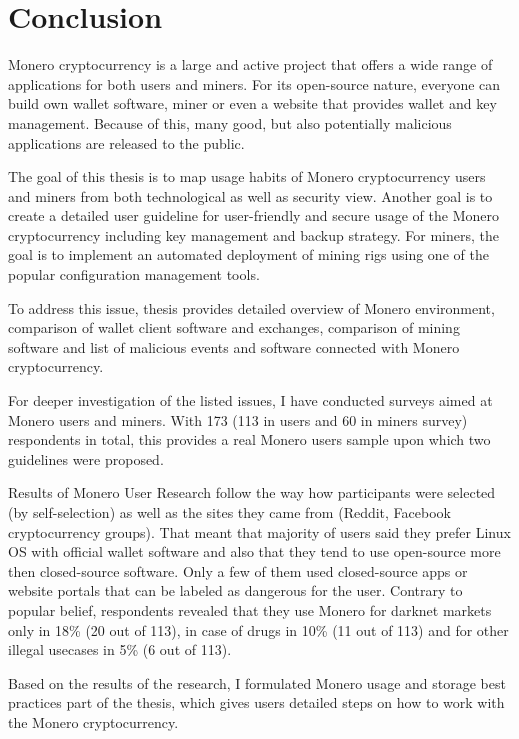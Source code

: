 \documentclass[
  printed, %
  table,   %
  lof,     %
  lot,     %
           oneside, color
]{fithesis3}
\begin{document}
\chapter{Conclusion}
Monero cryptocurrency is a large and active project that offers a wide range of applications for both users and miners. For its open-source nature, everyone can build own wallet software, miner or even a website that provides wallet and key management. Because of this, many good, but also potentially malicious applications are released to the public. 

The goal of this thesis is to map usage habits of Monero cryptocurrency users and miners from both technological as well as security view. Another goal is to create a detailed user guideline for user-friendly and secure usage of the Monero cryptocurrency including key management and backup strategy. For miners, the goal is to implement an automated deployment of mining rigs using one of the popular configuration management tools.

To address this issue, thesis provides detailed overview of Monero environment, comparison of wallet client software and exchanges, comparison of mining software and list of malicious events and software connected with Monero cryptocurrency.

For deeper investigation of the listed issues, I have conducted surveys aimed at Monero users and miners. With 173 (113 in users and 60 in miners survey) respondents in total, this provides a real Monero users sample upon which two guidelines were proposed. %

Results of Monero User Research follow the way how participants were selected (by self-selection) as well as the sites they came from (Reddit, Facebook cryptocurrency groups). That meant that majority of users said they prefer Linux OS with official wallet software and also that they tend to use open-source more then closed-source software. Only a few of them used closed-source apps or website portals that can be labeled as dangerous for the user. Contrary to popular belief, respondents revealed that they use Monero for darknet markets only in 18\% (20 out of 113), in case of drugs in 10\% (11 out of 113) and for other illegal usecases in 5\% (6 out of 113).

Based on the results of the research, I formulated Monero usage and storage best practices part of the thesis, which gives users detailed steps on how to work with the Monero cryptocurrency.
\end{document}
